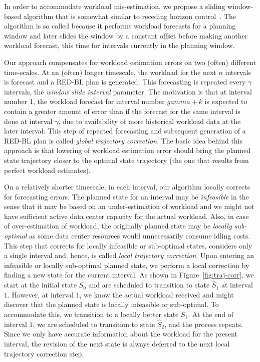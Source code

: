 In order to accommodate workload mis-estimation, we propose a sliding window-based algorithm that is somewhat similar to receding horizon control~\cite{rhc}. The algorithm is so called because it performs workload forecasts for a planning window and later slides the window by a constant offset before making another workload forecast, this time for intervals currently in the planning window. 

Our approach compensates for workload estimation errors on two (often) different time-scales. At an (often) longer timescale, the workload for the next $n$ intervals is forecast and a RED-BL plan is generated. This forecasting is repeated every $\gamma$ intervals, the \textit{window slide interval} parameter. The motivation is that at interval number 1, the workload forecast for interval number $gamma+k$ is expected to contain a greater amount of error than if the forecast for the same interval is done at interval $\gamma$, due to availability of more historical workload data at the later interval. This step of repeated forecasting and subsequent generation of a RED-BL plan is called \textit{global trajectory correction}. The basic idea behind this approach is that lowering of workload estimation error should bring the planned state trajectory closer to the optimal state trajectory (the one that results from perfect workload estimates). 

On a relatively shorter timescale, in each interval, our algorithm locally corrects for forecasting errors. The planned state for an interval may be \textit{infeasible} in the sense that it may be based on an under-estimation of workload and we might not have sufficient active data center capacity for the actual workload. Also, in case of over-estimation of workload, the originally planned state may be \textit{locally sub-optimal} as some data center resources would unnecessarily consume idling costs. This step that corrects for locally infeasible or sub-optimal states, considers only a single interval and, hence, is called \textit{local trajectory correction}. Upon entering an infeasible or locally sub-optimal planned state, we perform a local correction by finding a new state for the current interval. As shown in Figure~\ref{fig:traj-corr}, we start at the initial state $S_0$ and are scheduled to transition to state $\hat{S}_1$ at interval $1$. However, at interval $1$, we know the actual workload received and might discover that the planned state is locally infeasible or sub-optimal. To accommodate this, we transition to a locally better state $S_1$. At the end of interval $1$, we are scheduled to transition to state $\hat{S}_2$, and the process repeats. Since we only have accurate information about the workload for the present interval, the revision of the next state is always deferred to the next local trajectory correction step.

